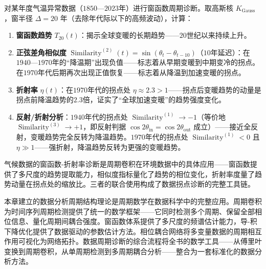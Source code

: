 \begin{example}\label{ex:window_refraction_diagnosis}
对某年度气温异常数据（$1850$—$2023$年）进行窗函数周期诊断。取高斯核 $K_{\text{Gauss}}$，窗半径 $\Delta = 20$ 年（去除年代际以下的高频波动），计算：
\begin{enumerate}[label=(\roman*)]
    \item \textbf{窗函数趋势} $T_{20}(t)$：揭示全球变暖的长期趋势——$20$世纪以来持续上升。
    \item \textbf{正弦差角相似度} $\operatorname{Similarity}^{(2)}(t) = \sin(\theta_t - \theta_{t-10})$（$10$年延迟）：在$1940$—$1970$年的“降温期”出现负值——标志着从早期变暖到中期变冷的拐点。在$1970$年代后期再次出现正值恢复——标志着从降温到加速变暖的拐点。
    \item \textbf{折射率} $\eta(t)$：在$1970$年代的拐点处 $\eta \approx 2.3 > 1$——拐点后变暖趋势的动量是拐点前降温趋势的$2.3$倍，证实了“全球加速变暖”的趋势强度变化。
    \item \textbf{反射/折射分析}：$1940$年代的拐点处 $\operatorname{Similarity}^{(1)} \to -1$（等价地 $\operatorname{Similarity}^{(3)} \to +1$，即反射判据 $\cos 2\theta_{\text{in}} = \cos 2\theta_{\text{out}}$ 成立）——接近全反射，变暖趋势完全反转为降温趋势。$1970$年代的拐点处 $\operatorname{Similarity}^{(1)} < 0$ 且 $\eta \gg 1$——强折射，降温趋势反转为更强的变暖趋势。
\end{enumerate}
气候数据的窗函数-折射率诊断是周期卷积在环境数据中的具体应用——窗函数提供了多尺度的趋势提取能力，相似度指标量化了趋势的相位变化，折射率度量了趋势动量在拐点处的缩放比。三者的联合使用构成了数据拐点诊断的完整工具链。
\end{example}

\begin{remark}[与全书的统一]
本章建立的数据分析周期结构理论是周期数学在数据科学中的完整应用。周期卷积为时间序列周期检测提供了统一的数学框架——它同时检测多个周期、保留全部相位信息、量化周期间耦合强度。窗函数体系提供了多尺度的频谱估计能力，导-积下降优化提供了数据驱动的参数估计方法。相位耦合网络将多变量数据的周期相互作用可视化为网络拓扑。数据周期诊断的综合流程将全书的数学工具——从傅里叶变换到周期卷积，从单周期检测到多周期耦合分析——整合为一套标准化的数据分析方法。
\end{remark}

